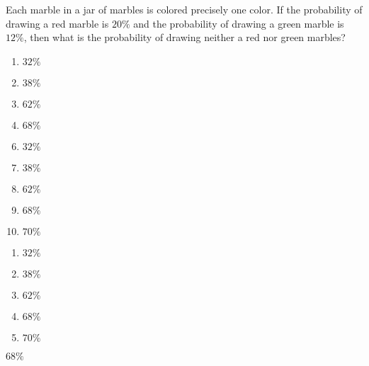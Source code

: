 


 Each marble in a jar of marbles is colored precisely one color.  If the probability of drawing a red marble is $20\%$ and the probability of drawing a green marble is $12\%$, then what is the probability of drawing neither a red nor green marbles?


\ifsat
	\begin{enumerate}[label=\Alph*)]
		\item   $32\%$
		\item  $38\%$
		\item  $62\%$
		\item  $68\%$%
	\end{enumerate}
\else
\fi

\ifacteven
	\begin{enumerate}[label=\textbf{\Alph*.},itemsep=\fill,align=left]
		\setcounter{enumii}{5}
		\item   $32\%$
		\item  $38\%$
		\item  $62\%$
		\addtocounter{enumii}{1}
		\item  $68\%$%
		\item  $70\%$
	\end{enumerate}
\else
\fi

\ifactodd
	\begin{enumerate}[label=\textbf{\Alph*.},itemsep=\fill,align=left]
		\item   $32\%$
		\item  $38\%$
		\item  $62\%$
		\item  $68\%$%
		\item  $70\%$
	\end{enumerate}
\else
\fi

\ifgridin
  $68\%$%

\else
\fi

